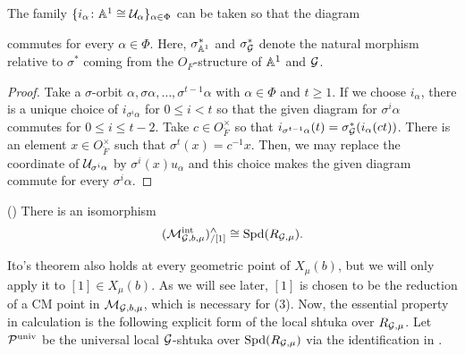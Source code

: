 \documentclass[12pt,reqno]{amsart}
\begin{document}
\begin{lem} \label{lem:choiceia}
    The family $\{i_\alpha\colon \mathbb{A}^1 \cong {\mathcal{U}}_{\alpha}\}_{\alpha \in \Phi}$ can be taken so that the diagram
    \begin{center}
    \end{center}
    commutes for every $\alpha \in \Phi$. Here, $\sigma^*_{\mathbb{A}^1}$ and $\sigma^*_{{\mathcal{G}}}$ denote the natural morphism relative to $\sigma^*$ coming from the $O_F$-structure of $\mathbb{A}^1$ and ${\mathcal{G}}$. 
\end{lem}
\begin{proof}
    Take a $\sigma$-orbit $\alpha, \sigma \alpha, \ldots, \sigma^{t-1}\alpha$ with $\alpha \in \Phi$ and $t \geq 1$. If we choose $i_\alpha$, there is a unique choice of $i_{\sigma^i\alpha}$ for $0\leq i < t$ so that the given diagram for $\sigma^i\alpha$ commutes for $0 \leq i \leq t - 2$. Take $c \in O_{\breve{F}}^\times$ so that $i_{\sigma^{t-1}\alpha}(t) = \sigma^*_{{\mathcal{G}}}(i_{\alpha}(ct))$. There is an element $x \in O_{\breve{F}}^\times$ such that $\sigma^t(x) = c^{-1}x$. Then, we may replace the coordinate of ${\mathcal{U}}_{\sigma^i\alpha}$ by $\sigma^i(x)u_\alpha$ and this choice makes the given diagram commute for every $\sigma^i\alpha$. 
\end{proof}

\begin{thm}\textup{(\cite[Theorem 5.3.5]{Ito25a})} \label{thm:univdef}
    There is an isomorphism
    \[
        ({\mathcal{M}}^{\operatorname{int}}_{{\mathcal{G}},b,\mu})^\wedge_{/[1]} \cong {\operatorname{Spd}}(R_{{\mathcal{G}}, \mu}). 
    \]
\end{thm}

Ito's theorem also holds at every geometric point of $X_\mu(b)$, but we will only apply it to $[1] \in X_\mu(b)$. As we will see later, $[1]$ is chosen to be the reduction of a CM point in ${\mathcal{M}}_{{\mathcal{G}}, b, \mu}$, which is necessary for  (3). Now, the essential property in calculation is the following explicit form of the local shtuka over $R_{{\mathcal{G}}, \mu}$. Let ${\mathcal{P}}^{\operatorname{univ}}$ be the universal local ${\mathcal{G}}$-shtuka over ${\operatorname{Spd}}(R_{{\mathcal{G}}, \mu})$ via the identification in . 
\end{document}
